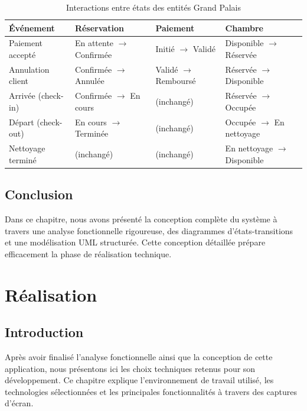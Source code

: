 \documentclass[12pt, a4paper]{report}
\begin{document}
\begin{table}[H]
  \centering
  \small
  \caption{Interactions entre états des entités Grand Palais}
  \label{tab:state_sync}
  \renewcommand{\arraystretch}{1.1}
  \begin{tabularx}{\textwidth}{lXXX}
    \toprule
    \textbf{Événement} & \textbf{Réservation} & \textbf{Paiement} & \textbf{Chambre} \\
    \midrule
    Paiement accepté &
      En attente $\rightarrow$ Confirmée &
      Initié $\rightarrow$ Validé &
      Disponible $\rightarrow$ Réservée \\
    Annulation client &
      Confirmée $\rightarrow$ Annulée &
      Validé $\rightarrow$ Remboursé &
      Réservée $\rightarrow$ Disponible \\
    Arrivée (check-in) &
      Confirmée $\rightarrow$ En cours &
      (inchangé) &
      Réservée $\rightarrow$ Occupée \\
    Départ (check-out) &
      En cours $\rightarrow$ Terminée &
      (inchangé) &
      Occupée $\rightarrow$ En nettoyage \\
    Nettoyage terminé &
      (inchangé) &
      (inchangé) &
      En nettoyage $\rightarrow$ Disponible \\
    \bottomrule
  \end{tabularx}
\end{table}

\section{Conclusion}

Dans ce chapitre, nous avons présenté la conception complète du système à travers une
analyse fonctionnelle rigoureuse, des diagrammes d'états-transitions et une modélisation
UML structurée. Cette conception détaillée prépare efficacement la phase de réalisation
technique.

\chapter{Réalisation}

\section{Introduction}

Après avoir finalisé l'analyse fonctionnelle ainsi que la conception de cette application,
nous présentons ici les choix techniques retenus pour son développement. Ce chapitre explique
l'environnement de travail utilisé, les technologies sélectionnées et les principales
fonctionnalités à travers des captures d'écran.
\end{document}
